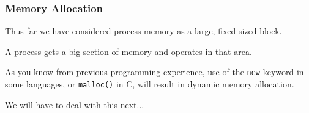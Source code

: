 \begin{frame}
\frametitle{Memory Allocation}

Thus far we have considered process memory as a large, fixed-sized block.

 A process gets a big section of memory and operates in that area.
 
As you know from previous programming experience, use of the \texttt{new} keyword in some languages, or \texttt{malloc()} in C, will result in dynamic memory allocation. 

We will have to deal with this next...

\end{frame}


